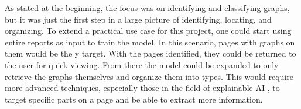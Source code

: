 \documentclass[12pt]{article}
\begin{document}
            As stated at the beginning, the focus was on identifying and classifying graphs, 
            but it was just the first step in a large picture of identifying, locating, and organizing. 
            To extend a practical use case for this project, one could start using entire reports as input to train the model. 
            In this scenario, pages with graphs on them would be the y target. 
            With the pages identified, they could be returned to the user for quick viewing. 
            From there the model could be expanded to only retrieve the graphs themselves and organize them into types. 
            This would require more advanced techniques, 
            especially those in the field of explainable AI \cite{kamakshi2023}, 
            to target specific parts on a page and be able to extract more information.
        
    
    \printbibliography[heading=bibintoc, title={References}]
\end{document}
